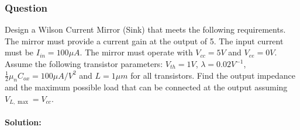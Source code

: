 \subsubsection{Question}
Design a Wilson Current Mirror (Sink) that meets the
following requirements. The mirror must provide a current
gain at the output of 5. The input current must be
$I_{in} = 100 \mu A$. The mirror must operate with
$V_{cc} = 5V$ and $V_{ee} = 0V$. Assume the following
transistor parameters: $V_{th} = 1V$, $\lambda = 0.02 V^{-1}$,
$\frac{1}{2} \mu_n C_{ox} = 100 \mu A/V^2$ and
$L = 1 \mu m$ for all transistors. Find the output impedance
and the maximum possible load that can be connected at the
output assuming $V_{L, \max} = V_{cc}$.
\paragraph{Solution:}
